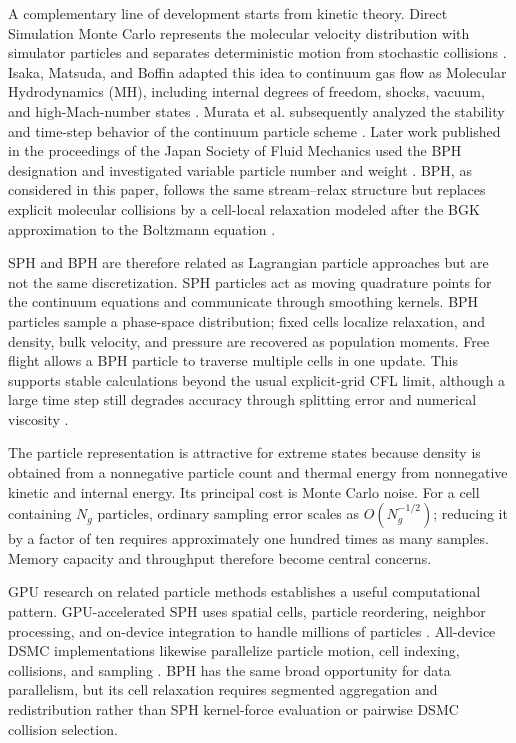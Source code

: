 \documentclass[a4paper,11pt]{article}
\begin{document}
A complementary line of development starts from kinetic theory.  Direct
Simulation Monte Carlo represents the molecular velocity distribution with
simulator particles and separates deterministic motion from stochastic
collisions \cite{bird1994}.  Isaka, Matsuda, and Boffin adapted this idea to
continuum gas flow as Molecular Hydrodynamics (MH), including internal degrees
of freedom, shocks, vacuum, and high-Mach-number states \cite{isaka2006}.
Murata et al. subsequently analyzed the stability and time-step behavior of the
continuum particle scheme \cite{murata2008}.  Later work published in the
proceedings of the Japan Society of Fluid Mechanics used the BPH designation
and investigated variable particle number and weight \cite{isaka2010}.  BPH,
as considered in this paper, follows the same stream--relax structure but
replaces explicit molecular collisions by a cell-local relaxation modeled
after the BGK approximation to the Boltzmann equation \cite{bgk}.

SPH and BPH are therefore related as Lagrangian particle approaches but are not
the same discretization.  SPH particles act as moving quadrature points for the
continuum equations and communicate through smoothing kernels.  BPH particles
sample a phase-space distribution; fixed cells localize relaxation, and density,
bulk velocity, and pressure are recovered as population moments.  Free flight
allows a BPH particle to traverse multiple cells in one update.  This supports
stable calculations beyond the usual explicit-grid CFL limit, although a large
time step still degrades accuracy through splitting error and numerical
viscosity \cite{isaka2006,murata2008}.

The particle representation is attractive for extreme states because density
is obtained from a nonnegative particle count and thermal energy from
nonnegative kinetic and internal energy.  Its principal cost is Monte Carlo
noise.  For a cell containing $N_g$ particles, ordinary sampling error scales
as $O(N_g^{-1/2})$; reducing it by a factor of ten requires approximately one
hundred times as many samples.  Memory capacity and throughput therefore become
central concerns.

GPU research on related particle methods establishes a useful computational
pattern.  GPU-accelerated SPH uses spatial cells, particle reordering, neighbor
processing, and on-device integration to handle millions of particles
\cite{crespo2011}.  All-device DSMC implementations likewise parallelize
particle motion, cell indexing, collisions, and sampling \cite{su2012}.  BPH
has the same broad opportunity for data parallelism, but its cell relaxation
requires segmented aggregation and redistribution rather than SPH kernel-force
evaluation or pairwise DSMC collision selection.
\end{document}
